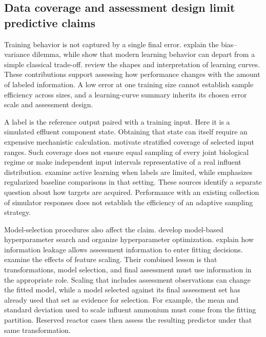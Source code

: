 \subsection{Data coverage and assessment design limit predictive claims}

Training behavior is not captured by a single final error. \citet{Geman1992} explain the bias--variance dilemma, while \citet{Belkin2019} show that modern learning behavior can depart from a simple classical trade-off. \citet{VieringLoog2023} review the shapes and interpretation of learning curves. These contributions support assessing how performance changes with the amount of labeled information. A low error at one training size cannot establish sample efficiency across sizes, and a learning-curve summary inherits its chosen error scale and assessment design.

A label is the reference output paired with a training input. Here it is a simulated effluent component state. Obtaining that state can itself require an expensive mechanistic calculation. \citet{McKay1979} motivate stratified coverage of selected input ranges. Such coverage does not ensure equal sampling of every joint biological regime or make independent input intervals representative of a real influent distribution. \citet{Guyon2011} examine active learning when labels are limited, while \citet{Cawley2011} emphasizes regularized baseline comparisons in that setting. These sources identify a separate question about how targets are acquired. Performance with an existing collection of simulator responses does not establish the efficiency of an adaptive sampling strategy.

Model-selection procedures also affect the claim. \citet{Bergstra2011} develop model-based hyperparameter search and \citet{Akiba2019} organize hyperparameter optimization. \citet{Kaufman2012} explain how information leakage allows assessment information to enter fitting decisions. \citet{Pinheiro2025} examine the effects of feature scaling. Their combined lesson is that transformations, model selection, and final assessment must use information in the appropriate role. Scaling that includes assessment observations can change the fitted model, while a model selected against its final assessment set has already used that set as evidence for selection. For example, the mean and standard deviation used to scale influent ammonium must come from the fitting partition. Reserved reactor cases then assess the resulting predictor under that same transformation.

